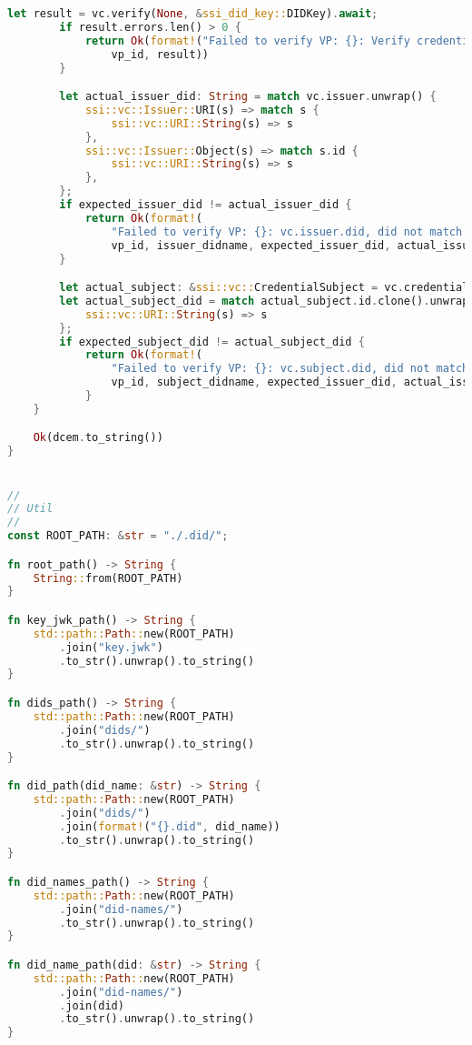 \begin{lstlisting}[language=Rust]
        let result = vc.verify(None, &ssi_did_key::DIDKey).await;
        if result.errors.len() > 0 {
            return Ok(format!("Failed to verify VP: {}: Verify credential failed: {:#?}",
                vp_id, result))
        }

        let actual_issuer_did: String = match vc.issuer.unwrap() {
            ssi::vc::Issuer::URI(s) => match s {
                ssi::vc::URI::String(s) => s
            },
            ssi::vc::Issuer::Object(s) => match s.id {
                ssi::vc::URI::String(s) => s
            },
        };
        if expected_issuer_did != actual_issuer_did {
            return Ok(format!(
                "Failed to verify VP: {}: vc.issuer.did, did not match the did of {}: Expected did: {}: Actual did: {}",
                vp_id, issuer_didname, expected_issuer_did, actual_issuer_did));
        }

        let actual_subject: &ssi::vc::CredentialSubject = vc.credential_subject.to_single().unwrap();
        let actual_subject_did = match actual_subject.id.clone().unwrap() {
            ssi::vc::URI::String(s) => s
        };
        if expected_subject_did != actual_subject_did {
            return Ok(format!(
                "Failed to verify VP: {}: vc.subject.did, did not match the did of {}: Expected did: {}: Actual did: {}",
                vp_id, subject_didname, expected_issuer_did, actual_issuer_did));
            }
    }

    Ok(dcem.to_string())
}


//
// Util
//
const ROOT_PATH: &str = "./.did/";

fn root_path() -> String {
    String::from(ROOT_PATH)
}

fn key_jwk_path() -> String {
    std::path::Path::new(ROOT_PATH)
        .join("key.jwk")
        .to_str().unwrap().to_string()
}

fn dids_path() -> String {
    std::path::Path::new(ROOT_PATH)
        .join("dids/")
        .to_str().unwrap().to_string()
}

fn did_path(did_name: &str) -> String {
    std::path::Path::new(ROOT_PATH)
        .join("dids/")
        .join(format!("{}.did", did_name))
        .to_str().unwrap().to_string()
}

fn did_names_path() -> String {
    std::path::Path::new(ROOT_PATH)
        .join("did-names/")
        .to_str().unwrap().to_string()
}

fn did_name_path(did: &str) -> String {
    std::path::Path::new(ROOT_PATH)
        .join("did-names/")
        .join(did)
        .to_str().unwrap().to_string()
}


\end{lstlisting}
